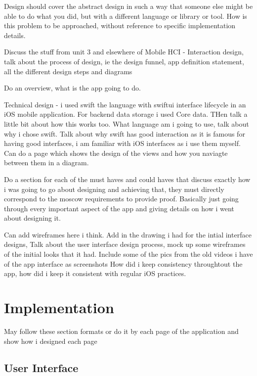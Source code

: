 \documentclass{l4proj}
\begin{document}
Design should cover the abstract design in such a way that someone else might be able to do what you did, 
but with a different language or library or tool.
How is this problem to be approached, without reference to specific implementation details.
\par 
Discuss the stuff from unit 3 and elsewhere of Mobile HCI - Interaction design, talk about the process of 
design, ie the design funnel, app definition statement, all the different design steps and diagrams
\par 
Do an overview, what is the app going to do.
\par 
Technical design - i used swift the language with swiftui interface lifecycle in an iOS mobile application.
For backend data storage i used Core data. THen talk a little bit about how this works too.
What language am i going to use, talk about why i chose swift. Talk about why swift has good interaction
as it is famous for having good interfaces, i am familiar with iOS interfaces as i use them myself.
Can do a page which shows the design of the views and how you naviagte between them in a diagram.
\par 
Do a section for each of the must haves and could haves that discuss exactly how i was going to go about 
designing and achieving that, they must directly correspond to the moscow requirements to provide proof.
Basically just going through every important aspect of the app and giving details on how i went about designing 
it. 
\par 
Can add wireframes here i think. Add in the drawing i had for the intial interface designs,
Talk about the user interface design process, mock up some wireframes of the initial looks that it had. Include
some of the pics from the old videos i have of the app interface as screenshots
How did i keep consistency throughtout the app, how did i keep it consistent with regular iOS practices.



\chapter{Implementation} \label{implementation}
May follow these section formats or do it by each page of the application and show how i designed each page 

\section{User Interface}
\end{document}

